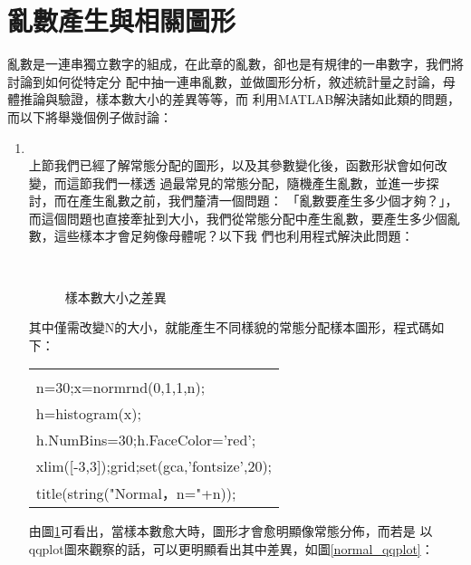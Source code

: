 	\section{亂數產生與相關圖形}
		亂數是一連串獨立數字的組成，在此章的亂數，卻也是有規律的一串數字，我們將討論到如何從特定分			配中抽一連串亂數，並做圖形分析，敘述統計量之討論，母體推論與驗證，樣本數大小的差異等等，而			利用MATLAB解決諸如此類的問題，而以下將舉幾個例子做討論：		
		\begin{enumerate}
		\item{\textbf{}\\		
			上節我們已經了解常態分配的圖形，以及其參數變化後，函數形狀會如何改變，而這節我們一樣透				過最常見的常態分配，隨機產生亂數，並進一步探討，而在產生亂數之前，我們釐清一個問題：				「亂數要產生多少個才夠？」，而這個問題也直接牽扯到\textbf{\color{darkblue}{樣本					數}}大小，我們從常態分配中產生亂數，要產生多少個亂數，這些樣本才會足夠像母體呢？以下我				們也利用程式解決此問題：
			\begin{figure}[H]
    		 	\centering
       			 \\
       			 \caption{樣本數大小之差異}   
   				 \label{normal_samplesize}
			\end{figure}			
			其中僅需改變N的大小，就能產生不同樣貌的常態分配樣本圖形，程式碼如下：			
			\begin{center}\colorbox{slight}{
				\begin{tabular}{p{}}
					\MJHmarker{\textbf{\color{darkblue}{MATLAB語法 :}}}\\		
					n=30;x=normrnd(0,1,1,n);\\					
					h=histogram(x);\\
					h.NumBins=30;h.FaceColor='red';\\					
					xlim([-3,3]);grid;set(gca,'fontsize',20);\\					
					title(string("Normal，n="+n));\\   					
				\end{tabular}
			}
			\end{center}		
			由圖\ref{normal_samplesize}可看出，當樣本數愈大時，圖形才會愈明顯像常態分佈，而若是				以qqplot圖來觀察的話，可以更明顯看出其中差異，如圖\ref{normal_qqplot}：
}
\end{enumerate}
